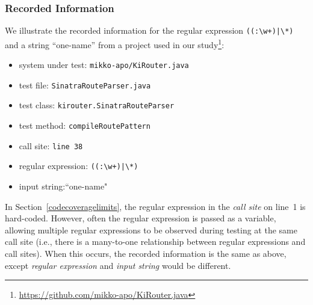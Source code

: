 \subsubsection{Recorded Information}
We illustrate the recorded information for the regular expression \verb!((:\w+)|\*)! and a string ``one-name'' from a project used in our study\footnote{\url{https://github.com/mikko-apo/KiRouter.java}}: %
\begin{itemize}%
\item system under test: {\tt mikko-apo/KiRouter.java}
\item test file: {\tt SinatraRouteParser.java}
\item test class: {\tt kirouter.SinatraRouteParser}
\item test method: {\tt compileRoutePattern}
\item call site: {\tt line 38}
\item regular expression: \verb!((:\w+)|\*)! 
\item input string:``one-name"
\end{itemize}

\noindent In Section~\ref{codecoveragelimits}, the regular expression in the \emph{call site} on line~1 is hard-coded. However, often the regular expression is passed as a variable, allowing multiple regular expressions to be observed during testing at the same call site (i.e., there is a many-to-one relationship between regular expressions and call sites). When this occurs, the recorded information is the same as above, except \emph{regular expression} and \emph{input string} would be different. 

